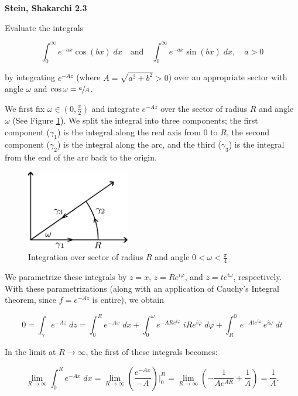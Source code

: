 \textbf{Stein, Shakarchi 2.3}

Evaluate the integrals 

$$
\int_{0}^{\infty} {e^{-ax} \cos{(bx)} \; dx} \quad \text{and} \quad \int_{0}^{\infty} {e^{-ax} \sin{(bx)} \; dx}, \quad a > 0
$$

by integrating $e^{-Az}$ (where $A = \sqrt{a^2 + b^2} > 0$) over an appropriate sector with angle $\omega$ and 
$\cos{\omega} = \sfrac{a}{A}$.

\begin{solution}
    We first fix $\omega \in \left(0, \frac{\pi}{2} \right)$ and integrate $e^{-Az}$ over the sector of radius $R$ and 
    angle $\omega$ (See Figure \ref{fig:problem_3}). We split the integral into three components; the first component 
    ($\gamma_1$) is the integral along the real axis from $0$ to $R$, the second component ($\gamma_2$) is the integral 
    along the arc, and the third ($\gamma_3$) is the integral from the end of the arc back to the origin. 

    \begin{figure}[h]
        \centering
        \includegraphics*[width=0.4\textwidth]{problem_3.png}
        \caption{Integration over sector of radius $R$ and angle $0 < \omega < \frac{\pi}{4}$}
        \label{fig:problem_3}
    \end{figure}
    
    We parametrize these integrals by $z = x$, $z = Re^{i\varphi}$, and $z = t e^{i\omega}$, respectively. With these 
    parametrizations (along with an application of Cauchy's Integral theorem, since $f = e^{-Az}$ is entire), we obtain

    $$
    0 = \int_{\gamma} {e^{-Az}} \; dz = \int_{0}^{R} {e^{-Ax}} \; dx + \int_{0}^{\omega} {e^{-ARe^{i\varphi}} \; iRe^{i\varphi}} \; d\varphi + \int_{R}^{0} {e^{-Ate^{i\omega}} \, e^{i\omega}} \; dt
    $$

    In the limit at $R \to \infty$, the first of these integrals becomes:

    $$
    \lim_{R \to \infty} \int_{0}^{R} {e^{-Ax}} \; dx = \lim_{R \to \infty} \left( \frac{e^{-Ax}}{-A} \right)\bigg|_{0}^{R} 
                                                     = \lim_{R \to \infty} \left( -\frac{1}{A e^{AR}} + \frac{1}{A} \right)
                                                     = \frac{1}{A}.
    $$


\end{solution}
